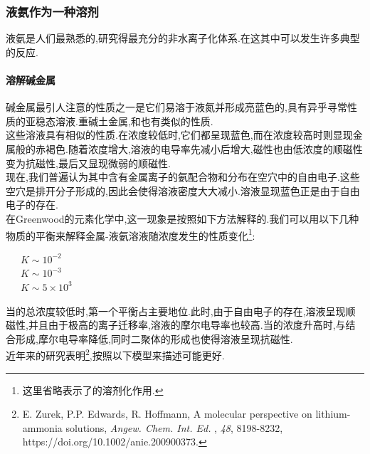 \documentclass{ctexart}
\begin{document}
\subsubsection{液氨作为一种溶剂}
液氨是人们最熟悉的,研究得最充分的非水离子化体系.在这其中可以发生许多典型的反应.
\paragraph{溶解碱金属}
碱金属最引人注意的性质之一是它们易溶于液氮并形成亮蓝色的,具有异乎寻常性质的亚稳态溶液.重碱土金属,和也有类似的性质.\\
\indent 这些溶液具有相似的性质.在浓度较低时,它们都呈现蓝色,而在浓度较高时则显现金属般的赤褐色.随着浓度增大,溶液的电导率先减小后增大,磁性也由低浓度的顺磁性变为抗磁性,最后又显现微弱的顺磁性.\\
\indent 现在,我们普遍认为其中含有金属离子的氨配合物和分布在空穴中的自由电子.这些空穴是排开分子形成的,因此会使得溶液密度大大减小.溶液显现蓝色正是由于自由电子的存在.\\
\indent 在Greenwood的元素化学中,这一现象是按照如下方法解释的.我们可以用以下几种物质的平衡来解释金属-液氨溶液随浓度发生的性质变化\footnote{这里省略表示了的溶剂化作用.}:
\begin{center}
    \ \ \ $K\sim10^{-2}$\\
    \ \ \ $K\sim10^{-3}$\\
    \ \ \ $K\sim5\times10^{3}$
\end{center}
当的总浓度较低时,第一个平衡占主要地位.此时,由于自由电子的存在,溶液呈现顺磁性,并且由于极高的离子迁移率,溶液的摩尔电导率也较高.当的浓度升高时,与结合形成,摩尔电导率降低,同时二聚体的形成也使得溶液呈现抗磁性.\\
\indent 近年来的研究表明\footnote{E. Zurek, P.P. Edwards, R. Hoffmann, A molecular perspective on lithium-ammonia solutions, \textit{Angew. Chem. Int. Ed.} , \textit{48}, 8198-8232, https://doi.org/10.1002/anie.200900373.},按照以下模型来描述可能更好.
\end{document}
